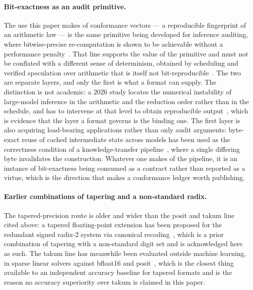 \documentclass[11pt]{article}
\theoremstyle{definition}
\begin{document}
\paragraph{Bit-exactness as an audit primitive.} The use this paper makes of
conformance vectors --- a reproducible fingerprint of an arithmetic law --- is the
same primitive being developed for inference auditing, where bitwise-precise
re-computation is shown to be achievable without a performance
penalty~\cite{cankaya2026}. That line supports the value of the primitive and
must not be conflated with a different sense of determinism, obtained by
scheduling and verified speculation over arithmetic that is itself not
bit-reproducible~\cite{gond2026llm42}. The two are separate layers, and only the
first is what a format can supply. The distinction is not academic: a 2026 study
locates the numerical instability of large-model inference in the arithmetic and
the reduction order rather than in the schedule, and has to intervene at that
level to obtain reproducible output~\cite{zhu2026heal}, which is evidence that the
layer a format governs is the binding one. The first layer is also acquiring load-bearing
applications rather than only audit arguments: byte-exact reuse of cached
intermediate state across models has been used as the correctness condition of a
knowledge-transfer pipeline~\cite{schelpe2026grafting}, where a single differing
byte invalidates the construction. Whatever one makes of the pipeline, it is an
instance of bit-exactness being consumed as a contract rather than reported as a
virtue, which is the direction that makes a conformance ledger worth publishing.

\paragraph{Earlier combinations of tapering and a non-standard radix.} The
tapered-precision route is older and wider than the posit and takum line cited
above: a tapered floating-point extension has been proposed for the redundant
signed radix-2 system via canonical recoding~\cite{schoenbaum2021}, which is a
prior combination of tapering with a non-standard digit set and is acknowledged
here as such. The takum line has meanwhile been evaluated outside machine
learning, in sparse linear solvers against bfloat16 and posit~\cite{hunhold2024sparse},
which is the closest thing available to an independent accuracy baseline for
tapered formats and is the reason no accuracy superiority over takum is claimed
in this paper.
\end{document}

